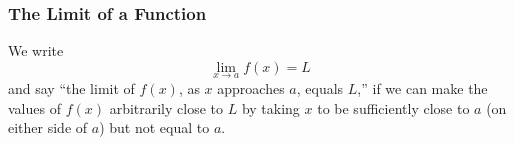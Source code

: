 \begin{frame}
\frametitle{The Limit of a Function}
\begin{definition}
We write
\[
\lim_{x\rightarrow a} f(x) = L
\]
and say ``the limit of $f(x)$, as $x$ approaches $a$, equals $L$,'' if we can make the values of $f(x)$ arbitrarily close to $L$ by taking $x$ to be sufficiently close to $a$ (on either side of $a$) but not equal to $a$.
\end{definition}
\begin{center}
\ %
%
%
\end{center}
\end{frame}
